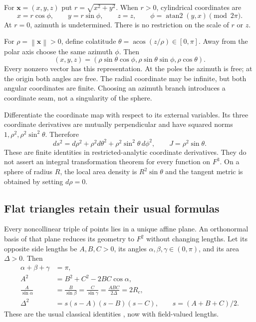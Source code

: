 \documentclass[11pt,letterpaper]{article}
\numberwithin{equation}{section}
\theoremstyle{definition}
\theoremstyle{remark}
\newcommand{\atantwo}{\operatorname{atan2}}
\newcommand{\acos}{\operatorname{acos}}
\newcommand{\norm}[1]{\left\lVert#1\right\rVert}
\newcommand{\vv}[1]{\bm{#1}}
\begin{document}
For $\vv x=(x,y,z)$ put $r=\sqrt{x^2+y^2}$. When $r>0$, cylindrical
coordinates are
\[
 x=r\cos\phi,\qquad y=r\sin\phi,\qquad z=z,
 \qquad \phi=\atantwo(y,x)\pmod{2\pi}.
\]
At $r=0$, azimuth is undetermined. There is no restriction on the scale of
$r$ or $z$.

For $\rho=\norm{\vv x}>0$, define colatitude
$\theta=\acos(z/\rho)\in[0,\pi]$. Away from the polar axis choose the same
azimuth $\phi$. Then
\begin{equation}\label{e3:eq:sphericalcoords}
 (x,y,z)=(\rho\sin\theta\cos\phi,
          \rho\sin\theta\sin\phi,\rho\cos\theta).
\end{equation}
Every nonzero vector has this representation. At the poles the azimuth is
free; at the origin both angles are free. The radial coordinate may be
infinite, but both angular coordinates are finite. Choosing an azimuth branch
introduces a coordinate seam, not a singularity of the sphere.

Differentiate the coordinate map with respect to its external variables.
Its three coordinate derivatives are mutually perpendicular and have squared
norms $1,\rho^2,\rho^2\sin^2\theta$. Therefore
\begin{equation}\label{e3:eq:sphericalmetric}
 ds^2=d\rho^2+\rho^2d\theta^2+
                    \rho^2\sin^2\theta\,d\phi^2,
 \qquad J=\rho^2\sin\theta.
\end{equation}
These are finite identities in restricted-analytic coordinate derivatives.
They do not assert an integral transformation theorem for every function on
$F^3$. On a sphere of radius $R$, the local area density is
$R^2\sin\theta$ and the tangent metric is obtained by setting $d\rho=0$.

\subsection{Flat triangles retain their usual formulas}

Every noncollinear triple of points lies in a unique affine plane. An
orthonormal basis of that plane reduces its geometry to $F^2$ without
changing lengths. Let its opposite side lengths be $A,B,C>0$, its angles
$\alpha,\beta,\gamma\in(0,\pi)$, and its area $\Delta>0$. Then
\begin{align}
 \alpha+\beta+\gamma&=\pi,\label{e3:eq:planeangles}\\
 A^2&=B^2+C^2-2BC\cos\alpha,\label{e3:eq:planecos}\\
 \frac{A}{\sin\alpha}
 &=\frac{B}{\sin\beta}=\frac{C}{\sin\gamma}
   =\frac{ABC}{2\Delta}=2R_c,\label{e3:eq:planesine}\\
 \Delta^2&=s(s-A)(s-B)(s-C),\qquad s=(A+B+C)/2.\label{e3:eq:heron}
\end{align}
These are the usual classical identities \cite[\S4.42(ii)]{DLMF}, now with
field-valued lengths.
\end{document}

